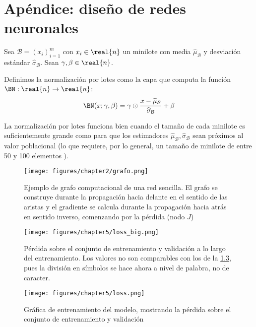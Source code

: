 \chapter{Apéndice: diseño de redes neuronales} \label{chapter:appendixA}
\begin{definition}
    Sea \( \mathcal{B} = (x_{i})_{i=1}^m \) con \( x_{i} \in \real{n} \) un minilote con media \( \widehat{\mu}_\mathcal{B} \) y desviación estándar  \( \widehat{\sigma}_\mathcal{B} \). Sean \( \gamma, \beta \in \real{n} \).

    Definimos la normalización por lotes como la capa que computa la función \( \BN: \real{n} \to \real{n} \):
    \[
        \BN(x; \gamma, \beta) = \gamma \odot \frac{x - \widehat{\mu}_\mathcal{B}}{\widehat{\sigma}_\mathcal{B}} + \beta
    \]
\end{definition}

La normalización por lotes funciona bien cuando el tamaño de cada minilote es suficientemente grande como para que los estimadores \( \widehat{\mu}_\mathcal{B}, \widehat{\sigma}_\mathcal{B} \) sean próximos al valor poblacional (lo que requiere, por lo general, un tamaño de minilote de entre 50 y 100 elementos \cite{luo2018towards}).

\begin{figure}[tb]
    \centering
    \texttt{[image: figures/chapter2/grafo.png]}
    \caption{Ejemplo de grafo computacional de una red sencilla. El grafo se construye durante la propagación hacia delante en el sentido de las aristas y el gradiente se calcula durante la propagación hacia atrás en sentido inverso, comenzando por la pérdida (nodo \( J\)) \cite{goodfellow2016deep}}
    \label{fig:graph}
\end{figure}


\begin{figure}[tb]
    \centering
    \texttt{[image: figures/chapter5/loss\_big.png]}
    \caption{Pérdida sobre el conjunto de entrenamiento y validación a lo largo del entrenamiento. Los valores no son comparables con los de la \cref{fig:loss}, pues la división en símbolos se hace ahora a nivel de palabra, no de caracter. }
    \label{fig:loss_big}
\end{figure}
\begin{figure}[tb]
    \centering
    \texttt{[image: figures/chapter5/loss.png]}
    \caption{Gráfica de entrenamiento del modelo, mostrando la pérdida sobre el conjunto de entrenamiento y validación}
    \label{fig:loss}
\end{figure}

